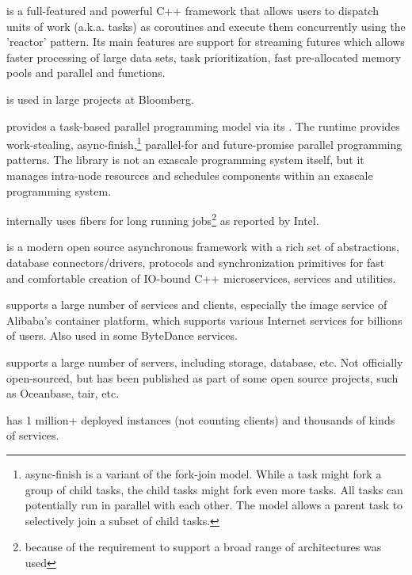 \cite{bbquantum} is a full-featured and
powerful C++ framework that allows users to dispatch units of work (a.k.a.
tasks) as coroutines and execute them concurrently using the 'reactor' pattern.
Its main features are support for streaming futures which allows faster processing
of large data sets, task prioritization, fast pre-allocated memory pools and
parallel  and  functions.

\bbquantum\xspace is used in large projects at Bloomberg.

provides a task-based parallel programming model via its \hclib\cite{hclib}.
The runtime provides work-stealing, async-finish,\footnote{async-finish is a
variant of the fork-join model. While a task might fork a group of
child tasks, the child tasks might fork even more tasks. All tasks can
potentially run in parallel with each other. The model allows a parent task to
selectively join a subset of child tasks.}
parallel-for and future-promise parallel programming patterns. The library is not an exascale
programming system itself, but it manages intra-node resources and schedules
components within an exascale programming system.

\cite{tbb} internally uses fibers for long running
jobs\footnote{because of the requirement to support a broad range of
architectures \href{https://github.com/intel/tbb/blob/tbb_2020/src/tbb/co_context.h\#L190}
{\swapcontext} was used} as reported by Intel.

\uabschnitt{\userver}\cite{userver} is a modern open source asynchronous
framework with a rich set of abstractions, database connectors/drivers,
protocols and synchronization primitives for fast and comfortable creation
of IO-bound C++ microservices, services and utilities.

\cite{photon} supports a large number of services
and clients, especially the image service of Alibaba’s container platform,
which supports various Internet services for billions of users.
Also used in some ByteDance services.

\cite{libeasy} supports a large number of
servers, including storage, database, etc. Not officially open-sourced, but
has been published as part of some open source projects, such as Oceanbase,
tair, etc.

\cite{bthread} has 1 million+ deployed instances
(not counting clients) and thousands of kinds of services.

